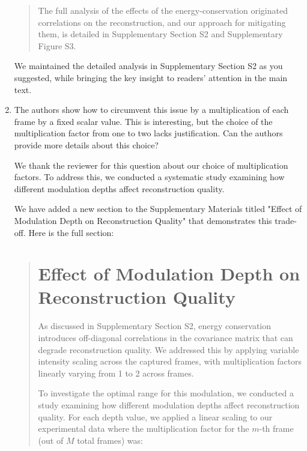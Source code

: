 \documentclass[12pt]{article}
\newenvironment{solved_reviewercomment}
    {\begin{tcolorbox}[width=\linewidth,colback=gray!5,colframe=solved_commentcolor!50,title=Reviewer Comment,left=5pt,right=5pt]}
    {\end{tcolorbox}}
\newenvironment{ourresponse}
    {\begin{tcolorbox}[width=\linewidth,breakable,enhanced,colback=gray!5,colframe=responsecolor!50,title=Response,left=5pt,right=5pt]}
    {\end{tcolorbox}}
\begin{document}
\begin{enumerate}[label=\arabic*.]
\begin{ourresponse}
\begin{quote}
        
        The full analysis of the effects of the energy-conservation originated correlations on the reconstruction, and our approach for mitigating them, is detailed in Supplementary Section S2 and Supplementary Figure S3.
    \end{quote}
    
    We maintained the detailed analysis in Supplementary Section S2 as you suggested, while bringing the key insight to readers' attention in the main text.

\end{ourresponse}


    
\item \leavevmode\vspace{-\baselineskip}
\begin{solved_reviewercomment}
    The authors show how to circumvent this issue by a multiplication of each frame by a fixed scalar value. This is interesting, but the choice of the multiplication factor from one to two lacks justification. Can the authors provide more details about this choice? 
\end{solved_reviewercomment}

\begin{ourresponse}
We thank the reviewer for this question about our choice of multiplication factors. To address this, we conducted a systematic study examining how different modulation depths affect reconstruction quality.

We have added a new section to the Supplementary Materials titled "Effect of Modulation Depth on Reconstruction Quality" that demonstrates this trade-off. Here is the full section:

\begin{quote}
\section*{Effect of Modulation Depth on Reconstruction Quality}

As discussed in Supplementary Section S2, energy conservation introduces off-diagonal correlations in the covariance matrix that can degrade reconstruction quality. We addressed this by applying variable intensity scaling across the captured frames, with multiplication factors linearly varying from 1 to 2 across frames.

To investigate the optimal range for this modulation, we conducted a study examining how different modulation depths affect reconstruction quality. For each depth value, we applied a linear scaling to our experimental data where the multiplication factor for the $m$-th frame (out of $M$ total frames) was:


\end{quote}
\end{ourresponse}
\end{enumerate}
\end{document}
